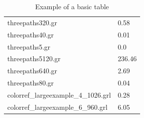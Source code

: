 \documentclass[11pt]{article}
\begin{document}
\begin{table}[h!]
\begin{tabularx}{\textwidth}{|l|X|}
		threepaths320.gr & 0.58 \\
		threepaths40.gr & 0.01 \\
		threepaths5.gr & 0.0 \\
		threepaths5120.gr & 236.46 \\
		threepaths640.gr & 2.69 \\
		threepaths80.gr & 0.04 \\
		colorref\_largeexample\_4\_1026.grl & 0.28 \\
		colorref\_largeexample\_6\_960.grl & 6.05 \\
        \hline
    \end{tabularx}
    \caption{Example of a basic table}
    \label{tab:1}
\end{table}
\end{document}
